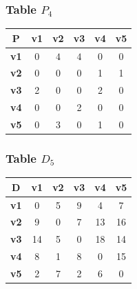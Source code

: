 \documentclass{beamer}
\begin{document}
\begin{frame}
\frametitle{Table $P_{4}$}
\begin{center}
    \begin{tabular}{|c||c|c|c|c|c|}
        \hline
        \textbf{P} & \textbf{v1} & \textbf{v2} & \textbf{v3} & \textbf{v4} & \textbf{v5} \\
        \hline
        \hline
        \textbf{v1}& 0 & \cellcolor[HTML]{D74894}$4$ & \cellcolor[HTML]{D74894}$4$ & 0 & 0 \\
        \hline
        \textbf{v2}& 0 & 0 & 0 & 1 & 1 \\
        \hline
        \textbf{v3}& 2 & 0 & 0 & 2 & 0 \\
        \hline
        \textbf{v4}& 0 & 0 & 2 & 0 & 0 \\
        \hline
        \textbf{v5}& 0 & 3 & 0 & 1 & 0 \\
        \hline
    \end{tabular}
\end{center}


\end{frame}





\begin{frame}
\frametitle{Table $D_{5}$}
\begin{center}
    \begin{tabular}{|c||c|c|c|c|c|}
        \hline
        \textbf{D} & \textbf{v1} & \textbf{v2} & \textbf{v3} & \textbf{v4} & \textbf{v5} \\
        \hline
        \hline
        \textbf{v1}& 0 & 5 & \cellcolor[HTML]{D74894}$9$ & 4 & 7 \\
        \hline
        \textbf{v2}& 9 & 0 & 7 & 13 & 16 \\
        \hline
        \textbf{v3}& 14 & 5 & 0 & 18 & 14 \\
        \hline
        \textbf{v4}& 8 & 1 & 8 & 0 & 15 \\
        \hline
        \textbf{v5}& 2 & 7 & 2 & 6 & 0 \\
        \hline
    \end{tabular}
\end{center}


\end{frame}
\end{document}
